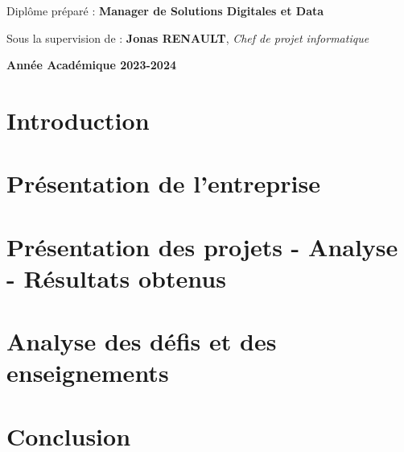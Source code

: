 \documentclass[a4paper, oneside, 12pt, final]{extreport}
\newcommand{\AU} {
\centering \textbf{Année Académique 2023-2024}
}
\begin{document}
\begin{titlepage}
\begin{center}
    \vspace{30pt}
    {Diplôme préparé : \textbf{\large Manager de Solutions Digitales et Data}}\\
    \vspace{46pt}

    Sous la supervision de :  \textbf{Jonas RENAULT}, \textit{Chef de projet informatique}\\
    \vspace{50pt}

  \end{center}
  \vspace{30pt}
  \AU\\
\end{titlepage}



\tableofcontents
{}

\listoffigures


\cleardoublepage

\newpage
{}
\chapter*{Introduction}
\label{chap:general_intorduction}



\chapter{Présentation de l'entreprise}
\label{chap:chapterone}


\chapter{Présentation des projets - Analyse - Résultats obtenus}
\label{chap:2}


\chapter{Analyse des défis et des enseignements}
\label{chap:3}


\chapter*{Conclusion}
\label{chap:conclusion}


\appendix
\newpage
\renewcommand{\thepage}{\Alph{page}}

% 



\nocite{*}






\cleardoublepage%

\end{document}
